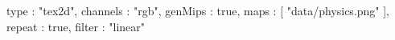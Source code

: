 {
	type : "tex2d",
	channels : "rgb",
	genMips : true,
	maps : [
		"data/physics.png"
	],
	repeat : true,
	filter : "linear"
}